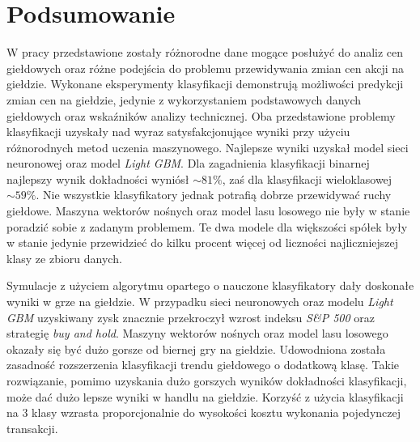 \documentclass[a4paper, twoside, 11pt, openright]{article}
\begin{document}
\newpage 
 
\section{Podsumowanie}

W pracy przedstawione zostały różnorodne dane mogące posłużyć do analiz cen giełdowych oraz różne podejścia do problemu przewidywania zmian cen akcji na giełdzie. Wykonane eksperymenty klasyfikacji demonstrują możliwości predykcji zmian cen na giełdzie, jedynie z wykorzystaniem podstawowych danych giełdowych oraz wskaźników analizy technicznej. Oba przedstawione problemy klasyfikacji uzyskały nad wyraz satysfakcjonujące wyniki przy użyciu różnorodnych metod uczenia maszynowego. Najlepsze wyniki uzyskał model sieci neuronowej oraz model \textit{Light GBM}. Dla zagadnienia klasyfikacji binarnej najlepszy wynik dokładności wyniósł $\sim 81\%$, zaś dla klasyfikacji wieloklasowej $\sim 59\%$. Nie wszystkie klasyfikatory jednak potrafią dobrze przewidywać ruchy giełdowe. Maszyna wektorów nośnych oraz model lasu losowego nie były w stanie poradzić sobie z zadanym problemem. Te dwa modele dla większości spółek były w stanie jedynie przewidzieć do kilku procent więcej od liczności najliczniejszej klasy ze zbioru danych.

\bigskip

Symulacje z użyciem algorytmu opartego o nauczone klasyfikatory dały doskonałe wyniki w grze na giełdzie. W przypadku sieci neuronowych oraz modelu \textit{Light GBM} uzyskiwany zysk znacznie przekroczył wzrost indeksu \textit{S\&P 500} oraz strategię \textit{buy and hold}. Maszyny wektorów nośnych oraz model lasu losowego okazały się być dużo gorsze od biernej gry na giełdzie. Udowodniona została zasadność rozszerzenia klasyfikacji trendu giełdowego o dodatkową klasę. Takie rozwiązanie, pomimo uzyskania dużo gorszych wyników dokładności klasyfikacji, może dać dużo lepsze wyniki w handlu na giełdzie. Korzyść z użycia klasyfikacji na 3 klasy wzrasta proporcjonalnie do wysokości kosztu wykonania pojedynczej transakcji. 

\bigskip
\end{document}
